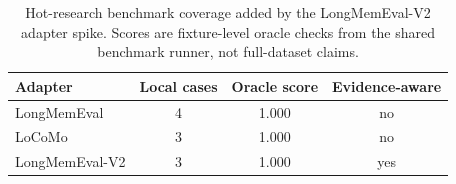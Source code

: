 \begin{table}[t]
    \centering
    \small
    \begin{tabular}{lccc}
        \toprule
        Adapter & Local cases & Oracle score & Evidence-aware \\
        \midrule
        LongMemEval & 4 & 1.000 & no \\
        LoCoMo & 3 & 1.000 & no \\
        LongMemEval-V2 & 3 & 1.000 & yes \\
        \bottomrule
    \end{tabular}
    \caption{Hot-research benchmark coverage added by the
    LongMemEval-V2 adapter spike. Scores are fixture-level oracle
    checks from the shared benchmark runner, not full-dataset claims.}
    \label{tab:hot-research-coverage}
\end{table}
